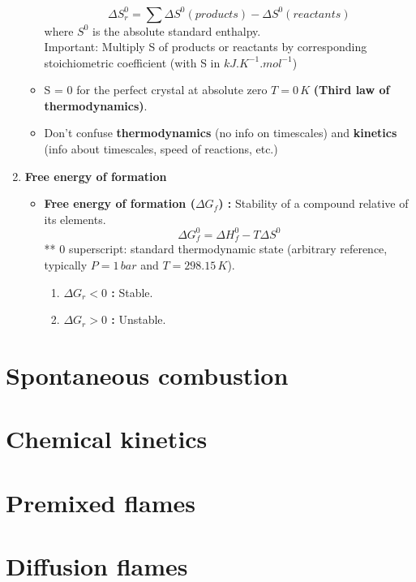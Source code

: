 \documentclass[a4paper,11pt]{article}
\begin{document}
\begin{enumerate}
\begin{itemize}
            \[\Delta S_r^0 = \sum \Delta S^0(products) - \Delta S^0(reactants)\] 
            where $S^0$ is the absolute standard enthalpy.\\
            Important: Multiply S of products or reactants by corresponding stoichiometric coefficient (with S in $kJ.K^{-1}.mol^{-1}$)
            \item S = 0 for the perfect crystal at absolute zero $T=0\,K$ \textbf{(Third law of thermodynamics)}.
            \item Don't confuse \textbf{thermodynamics} (no info on timescales) and \textbf{kinetics} (info about timescales, speed of reactions, etc.)
        \end{itemize}
    \item \textbf{Free energy of formation}
          
        \begin{itemize}
        \item \textbf{Free energy of formation
        ($\Delta G_f$) : } Stability of a compound relative of its elements.
            \[\Delta G^0_f = \Delta H^0_f - T \Delta S^0\]
            ** 0 superscript: standard thermodynamic state (arbitrary reference, typically $P=1\,bar$ and $T=298.15\,K$).
            \begin{enumerate}
                \item \textbf{$\Delta G_r < 0$ :} Stable.
                \item \textbf{$\Delta G_r > 0$ :} Unstable.
            \end{enumerate}
        \end{itemize}    
\end{enumerate}



\pagebreak
\section{Spontaneous combustion}
\pagebreak
\section{Chemical kinetics}
\pagebreak
\section{Premixed flames}
\pagebreak
\section{Diffusion flames}
\end{document}
